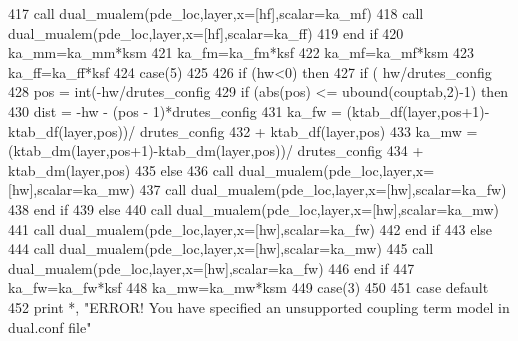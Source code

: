 \begin{DoxyCode}
{{417                         \textcolor{keyword}{call }dual_mualem(pde\_loc,layer,x=[hf],scalar=ka\_mf)
418                         \textcolor{keyword}{call }dual_mualem(pde\_loc,layer,x=[hf],scalar=ka\_ff)
419 \textcolor{keywordflow}{                end if}
420                 ka\_mm=ka\_mm*ksm
421                 ka\_fm=ka\_fm*ksf
422                 ka\_mf=ka\_mf*ksm
423                 ka\_ff=ka\_ff*ksf
424         \textcolor{keywordflow}{case}(5)
425 
426                 \textcolor{keywordflow}{if} (hw<0) \textcolor{keywordflow}{then}
427                   \textcolor{keywordflow}{if} ( hw/drutes_config%
428                         pos = int(-hw/drutes_config%
429                         \textcolor{keywordflow}{if} (abs(pos) <= ubound(couptab,2)-1) \textcolor{keywordflow}{then}
430                           dist = -hw - (pos - 1)*drutes_config%
431                           ka\_fw = (ktab\_df(layer,pos+1)-ktab\_df(layer,pos))/
      drutes_config%
432 \textcolor{comment}{                          + ktab\_df(layer,pos)}
433 \textcolor{comment}{                          ka\_mw = (ktab\_dm(layer,pos+1)-ktab\_dm(layer,pos))/
      drutes_config%
434 \textcolor{comment}{                          + ktab\_dm(layer,pos)}
435 \textcolor{comment}{                        }\textcolor{keywordflow}{else}
436                           \textcolor{keyword}{call }dual_mualem(pde\_loc,layer,x=[hw],scalar=ka\_mw)
437                           \textcolor{keyword}{call }dual_mualem(pde\_loc,layer,x=[hw],scalar=ka\_fw)
438 \textcolor{keywordflow}{                        end if}
439                   \textcolor{keywordflow}{else}
440                           \textcolor{keyword}{call }dual_mualem(pde\_loc,layer,x=[hw],scalar=ka\_mw)
441                           \textcolor{keyword}{call }dual_mualem(pde\_loc,layer,x=[hw],scalar=ka\_fw)
442 \textcolor{keywordflow}{                  end if}
443                 \textcolor{keywordflow}{else}
444                         \textcolor{keyword}{call }dual_mualem(pde\_loc,layer,x=[hw],scalar=ka\_mw)
445                         \textcolor{keyword}{call }dual_mualem(pde\_loc,layer,x=[hw],scalar=ka\_fw)
446 \textcolor{keywordflow}{                end if}
447                 ka\_fw=ka\_fw*ksf
448                 ka\_mw=ka\_mw*ksm
449         \textcolor{keywordflow}{case}(3)
450         
451 \textcolor{keywordflow}{        case default}
452                 print *, \textcolor{stringliteral}{"ERROR! You have specified an unsupported coupling term model in dual.conf file"}
}}}
\end{DoxyCode}
